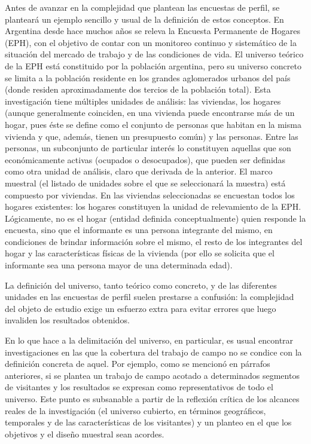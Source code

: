 \documentclass[
]{book}
\begin{document}
Antes de avanzar en la complejidad que plantean las encuestas de perfil, se planteará un ejemplo sencillo y usual de la definición de estos conceptos. En Argentina desde hace muchos años se releva la Encuesta Permanente de Hogares (EPH), con el objetivo de contar con un monitoreo continuo y sistemático de la situación del mercado de trabajo y de las condiciones de vida. El universo teórico de la EPH está constituido por la población argentina, pero su universo concreto se limita a la población residente en los grandes aglomerados urbanos del país (donde residen aproximadamente dos tercios de la población total). Esta investigación tiene múltiples unidades de análisis: las viviendas, los hogares (aunque generalmente coinciden, en una vivienda puede encontrarse más de un hogar, pues éste se define como el conjunto de personas que habitan en la misma vivienda y que, además, tienen un presupuesto común) y las personas. Entre las personas, un subconjunto de particular interés lo constituyen aquellas que son económicamente activas (ocupados o desocupados), que pueden ser definidas como otra unidad de análisis, claro que derivada de la anterior. El marco muestral (el listado de unidades sobre el que se seleccionará la muestra) está compuesto por viviendas. En las viviendas seleccionadas se encuestan todos los hogares existentes: los hogares constituyen la unidad de relevamiento de la EPH. Lógicamente, no es el hogar (entidad definida conceptualmente) quien responde la encuesta, sino que el informante es una persona integrante del mismo, en condiciones de brindar información sobre el mismo, el resto de los integrantes del hogar y las características físicas de la vivienda (por ello se solicita que el informante sea una persona mayor de una determinada edad).

La definición del universo, tanto teórico como concreto, y de las diferentes unidades en las encuestas de perfil suelen prestarse a confusión: la complejidad del objeto de estudio exige un esfuerzo extra para evitar errores que luego invaliden los resultados obtenidos.

En lo que hace a la delimitación del universo, en particular, es usual encontrar investigaciones en las que la cobertura del trabajo de campo no se condice con la definición concreta de aquel. Por ejemplo, como se mencionó en párrafos anteriores, si se plantea un trabajo de campo acotado a determinados segmentos de visitantes y los resultados se expresan como representativos de todo el universo. Este punto es subsanable a partir de la reflexión crítica de los alcances reales de la investigación (el universo cubierto, en términos geográficos, temporales y de las características de los visitantes) y un planteo en el que los objetivos y el diseño muestral sean acordes.
\end{document}

